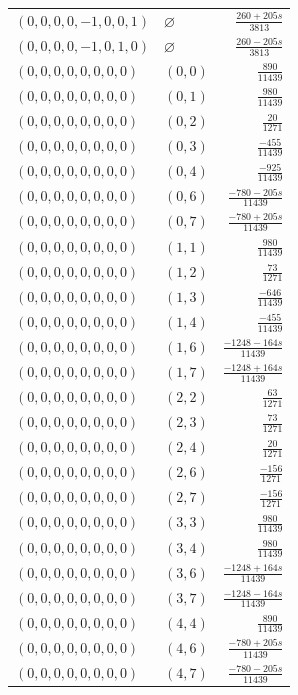 \begin{longtable}{@{}llr@{}}
$(0,0,0,0,-1,0,0,1)$ & $\varnothing$ & $\frac{260+205s}{3813}$\\
$(0,0,0,0,-1,0,1,0)$ & $\varnothing$ & $\frac{260-205s}{3813}$\\
$(0,0,0,0,0,0,0,0)$ & $(0,0)$ & $\frac{890}{11439}$\\
$(0,0,0,0,0,0,0,0)$ & $(0,1)$ & $\frac{980}{11439}$\\
$(0,0,0,0,0,0,0,0)$ & $(0,2)$ & $\frac{20}{1271}$\\
$(0,0,0,0,0,0,0,0)$ & $(0,3)$ & $\frac{-455}{11439}$\\
$(0,0,0,0,0,0,0,0)$ & $(0,4)$ & $\frac{-925}{11439}$\\
$(0,0,0,0,0,0,0,0)$ & $(0,6)$ & $\frac{-780-205s}{11439}$\\
$(0,0,0,0,0,0,0,0)$ & $(0,7)$ & $\frac{-780+205s}{11439}$\\
$(0,0,0,0,0,0,0,0)$ & $(1,1)$ & $\frac{980}{11439}$\\
$(0,0,0,0,0,0,0,0)$ & $(1,2)$ & $\frac{73}{1271}$\\
$(0,0,0,0,0,0,0,0)$ & $(1,3)$ & $\frac{-646}{11439}$\\
$(0,0,0,0,0,0,0,0)$ & $(1,4)$ & $\frac{-455}{11439}$\\
$(0,0,0,0,0,0,0,0)$ & $(1,6)$ & $\frac{-1248-164s}{11439}$\\
$(0,0,0,0,0,0,0,0)$ & $(1,7)$ & $\frac{-1248+164s}{11439}$\\
$(0,0,0,0,0,0,0,0)$ & $(2,2)$ & $\frac{63}{1271}$\\
$(0,0,0,0,0,0,0,0)$ & $(2,3)$ & $\frac{73}{1271}$\\
$(0,0,0,0,0,0,0,0)$ & $(2,4)$ & $\frac{20}{1271}$\\
$(0,0,0,0,0,0,0,0)$ & $(2,6)$ & $\frac{-156}{1271}$\\
$(0,0,0,0,0,0,0,0)$ & $(2,7)$ & $\frac{-156}{1271}$\\
$(0,0,0,0,0,0,0,0)$ & $(3,3)$ & $\frac{980}{11439}$\\
$(0,0,0,0,0,0,0,0)$ & $(3,4)$ & $\frac{980}{11439}$\\
$(0,0,0,0,0,0,0,0)$ & $(3,6)$ & $\frac{-1248+164s}{11439}$\\
$(0,0,0,0,0,0,0,0)$ & $(3,7)$ & $\frac{-1248-164s}{11439}$\\
$(0,0,0,0,0,0,0,0)$ & $(4,4)$ & $\frac{890}{11439}$\\
$(0,0,0,0,0,0,0,0)$ & $(4,6)$ & $\frac{-780+205s}{11439}$\\
$(0,0,0,0,0,0,0,0)$ & $(4,7)$ & $\frac{-780-205s}{11439}$\\

\end{longtable}
